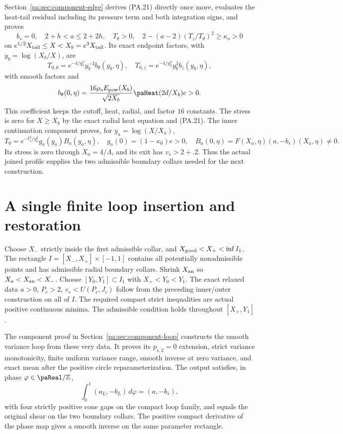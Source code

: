 \documentclass[10pt,a4paper]{article}
\begin{document}
Section~\ref{pa:sec:component-edge} derives (PA.21) directly once more, evaluates
the heat-tail residual including its pressure term and both integration signs,
and proves
\[
 b_s=0,\quad 2+h<a\le2+2h,\quad T_\theta>0,\quad
 2-(a-2)(T_z/T_\theta)^2\ge\kappa_o>0                           \tag{PA.22}
\]
on $e^{1/2}X_{\rm tail}\le X<X_b=e^3X_{\rm tail}$. Its exact endpoint
factors, with $y_b=\log(X_b/X)$, are
\[
 T_{0,\theta}=e^{-4/y_b^2}y_b^{-3}b_\theta(y_b,\eta),\quad
 T_{0,z}=e^{-4/y_b^2}y_b^3b_z(y_b,\eta),                         \tag{PA.23}
\]
with smooth factors and
\[
 b_\theta(0,\eta)=\frac{16\rho_o E_{\rm pow}(X_b)}{\sqrt{2X_b}}
                   \paHeat(2d/X_b)e>0.
\]
This coefficient keeps the cutoff, heat, radial, and factor $16$ constants.
The stress is zero for $X\ge X_b$ by the exact radial heat equation and (PA.21).
The inner continuation component proves, for $y_a=\log(X/X_a)$,
\[
 T_0=e^{-t_1^2/y_a^2}g_a(y_a)B_a(y_a,\eta),\quad
 g_a(0)=(1-\kappa_0)e>0,\quad
 B_a(0,\eta)=F(X_a,\eta)(a,-b_s)(X_a,\eta)\ne0.                 \tag{PA.24}
\]
Its stress is zero through $X_a=4/\Lambda$, and its exit has $v_s>2+.2$.
Thus the actual joined profile supplies the two admissible boundary collars
needed for the next construction.

\section{A single finite loop insertion and restoration}\label{pa:sec:assembly-loop}
Choose $X_-$ strictly inside the first admissible collar, and
$X_{\rm good}<X_+<\inf I_1$. The rectangle $I=[X_-,X_+]\times[-1,1]$
contains all potentially nonadmissible points and has admissible radial
boundary collars. Shrink $X_{\rm an}$ so $X_a<X_{\rm an}<X_-$.
Choose $[Y_0,Y_1]\subset I_1$ with $X_+<Y_0<Y_1$.
The exact relaxed data $a>0$, $P_c>2$, $v_s<U(P_c,J_c)$ follow from
the preceding inner/outer construction on all of $I$. The required compact
strict inequalities are actual positive continuous minima. The admissible
condition holds throughout $[X_+,Y_1]$.

The component proof in Section~\ref{pa:sec:component-loop} constructs the smooth
variance loop from these very data. It proves its $p_{s,2}=0$ extension, strict
variance monotonicity, finite uniform variance range, smooth inverse at zero
variance, and exact mean after the positive circle reparameterization.
The output satisfies, in phase $\varphi\in\paReal/\mathbb Z$,
\[
 \int_0^1(a_L,-b_L)\,d\varphi=(a,-b_s),
\]
with four strictly positive cone gaps on the compact loop family, and equals
the original shear on the two boundary collars. The positive compact derivative
of the phase map gives a smooth inverse on the same parameter rectangle.
\end{document}
